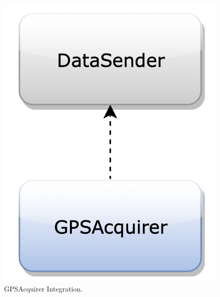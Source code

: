 \begin{figure}[H]
\begin{center}
        \begin{minipage}[c]{.40\textwidth}
	\centering
\includegraphics[scale=0.35]{Images/IntegrationPlanImages/fig9.png}
\caption{GPSAcquirer Integration.}
        \end{minipage}%
        \hspace{10mm}%
        \begin{minipage}[c]{.40\textwidth}
	\centering

\end{minipage}
\end{center}
\end{figure}

